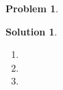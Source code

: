 \documentclass[a4paper,11pt]{article}
\numberwithin{equation}{section}
\theoremstyle{definition}
\newtheorem{prob}{Problem}[section]
\newtheorem{sln}{Solution}[section]
\begin{document}
\begin{prob}
\begin{sln}
\begin{enumerate}
				
				
				
				
				
				
				
				
				
				
				
				
				
				
				
				
				
				
				
				
				
				
				
				
				
				
				
				
				
				\item 
				\item 
				\item 
			\end{enumerate}
		\end{sln}

	
	
	
	
\end{prob}
\end{document}
